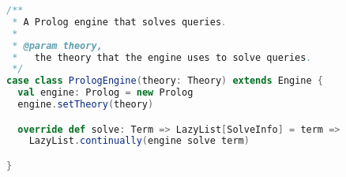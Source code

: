 \begin{lstlisting}[label=code:prolog-engine, language=Scala, caption=Motore TuProlog]
/**
 * A Prolog engine that solves queries.
 *
 * @param theory,
 *   the theory that the engine uses to solve queries.
 */
case class PrologEngine(theory: Theory) extends Engine {
  val engine: Prolog = new Prolog
  engine.setTheory(theory)

  override def solve: Term => LazyList[SolveInfo] = term =>
    LazyList.continually(engine solve term)

}
\end{lstlisting}